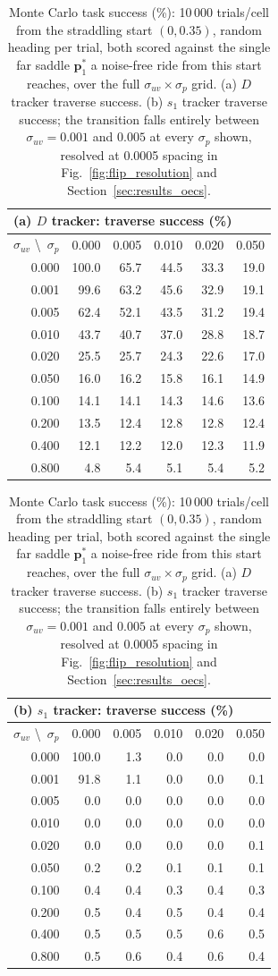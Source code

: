 \documentclass[lettersize,journal]{IEEEtran}
\begin{document}
\begin{table}[!t]
\centering
\caption{Monte Carlo task success (\%): 10\,000 trials/cell from the
straddling start $(0, 0.35)$, random heading per trial, both scored
against the single far saddle $\mathbf{p}^*_1$ a noise-free ride from
this start reaches, over the full $\sigma_{uv} \times \sigma_p$ grid.
(a) $D$ tracker traverse success. (b) $s_1$ tracker traverse success;
the transition falls entirely between $\sigma_{uv} = 0.001$ and $0.005$
at every $\sigma_p$ shown, resolved at 0.0005 spacing in
Fig.~\ref{fig:flip_resolution} and Section~\ref{sec:results_oecs}.}
\label{tab:mc_success}
\footnotesize
\setlength{\tabcolsep}{4pt}
\begin{tabular}{r|rrrrr}
\multicolumn{6}{l}{(a) $D$ tracker: traverse success (\%)} \\
\hline
$\sigma_{uv}$ \textbackslash\ $\sigma_p$ & 0.000 & 0.005 & 0.010 & 0.020 & 0.050 \\
\hline
0.000 & 100.0 & 65.7 & 44.5 & 33.3 & 19.0 \\
0.001 &  99.6 & 63.2 & 45.6 & 32.9 & 19.1 \\
0.005 &  62.4 & 52.1 & 43.5 & 31.2 & 19.4 \\
0.010 &  43.7 & 40.7 & 37.0 & 28.8 & 18.7 \\
0.020 &  25.5 & 25.7 & 24.3 & 22.6 & 17.0 \\
0.050 &  16.0 & 16.2 & 15.8 & 16.1 & 14.9 \\
0.100 &  14.1 & 14.1 & 14.3 & 14.6 & 13.6 \\
0.200 &  13.5 & 12.4 & 12.8 & 12.8 & 12.4 \\
0.400 &  12.1 & 12.2 & 12.0 & 12.3 & 11.9 \\
0.800 &   4.8 &  5.4 &  5.1 &  5.4 &  5.2 \\
\hline
\end{tabular}
\hspace{1.5em}
\begin{tabular}{r|rrrrr}
\multicolumn{6}{l}{(b) $s_1$ tracker: traverse success (\%)} \\
\hline
$\sigma_{uv}$ \textbackslash\ $\sigma_p$ & 0.000 & 0.005 & 0.010 & 0.020 & 0.050 \\
\hline
0.000 & 100.0 &  1.3 &  0.0 &  0.0 &  0.0 \\
0.001 &  91.8 &  1.1 &  0.0 &  0.0 &  0.1 \\
0.005 &   0.0 &  0.0 &  0.0 &  0.0 &  0.0 \\
0.010 &   0.0 &  0.0 &  0.0 &  0.0 &  0.0 \\
0.020 &   0.0 &  0.0 &  0.0 &  0.0 &  0.1 \\
0.050 &   0.2 &  0.2 &  0.1 &  0.1 &  0.1 \\
0.100 &   0.4 &  0.4 &  0.3 &  0.4 &  0.3 \\
0.200 &   0.5 &  0.4 &  0.5 &  0.4 &  0.4 \\
0.400 &   0.5 &  0.5 &  0.5 &  0.6 &  0.5 \\
0.800 &   0.5 &  0.6 &  0.4 &  0.6 &  0.4 \\
\hline
\end{tabular}
\end{table}
\end{document}
